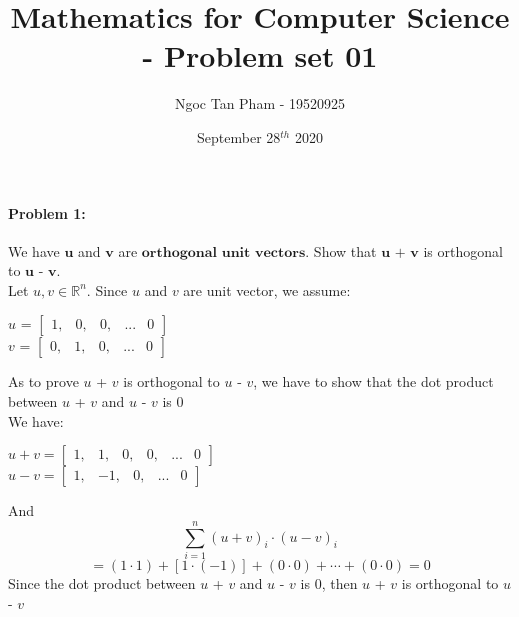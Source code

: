 \documentclass[11pt]{article}
\title{Mathematics for Computer Science - Problem set 01}
\author{Ngoc Tan Pham - 19520925 }
\date{September 28$^{th}$ 2020}
\begin{document}
\maketitle

\paragraph{Problem 1:}
\label{sec::problem1}We have $\textbf{u}$ and $\textbf{v}$ are $\textbf{orthogonal unit vectors}$. Show that $\textbf{u + v}$ is orthogonal to $\textbf{u - v}$.
\\[0.4cm]
Let $u, v \in \mathbb{R}^n$. Since $u$ and $v$ are unit vector, we assume:
\begin{center}
    ${u}$ = $\begin{bmatrix} 1,&0, &0, &... &0 \end{bmatrix}$\\[0.2cm] 
    ${v}$ = $\begin{bmatrix} 0,&1, &0, &... &0 \end{bmatrix}$ 
\end{center}
As to prove $u$ + $v$ is orthogonal to $u$ - $v$, we have to show that the dot product between $u$ + $v$ and $u$ - $v$ is 0\\[0.2cm]
We have:
\begin{center} 
    $u + v = \begin{bmatrix} 1, &1, &0, &0, &... &0 \end{bmatrix}$ \\[0.2cm]
    $u - v = \begin{bmatrix} 1,&-1, &0, &... &0 \end{bmatrix}$ \\[0.2cm]
\end{center}
And
$$\sum\limits_{i=1}^{n} (u + v)_{i}\cdot(u - v)_{i}$$
$$= (1 \cdot 1) + [1 \cdot (-1)] + (0 \cdot 0) + \cdots + (0 \cdot 0) = 0$$
Since the dot product between $u$ + $v$ and $u$ - $v$ is $0$, then $u$ + $v$ is orthogonal to $u$ - $v$ 
\end{document}
